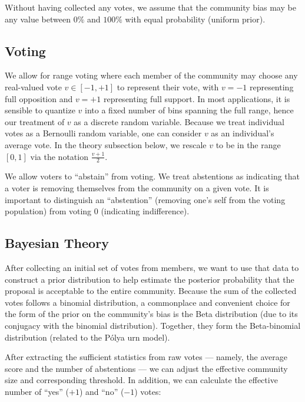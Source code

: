 \documentclass[chi_draft]{sigchi}
\begin{document}
Without having collected any votes, we assume that the community bias may be any value between $0\%$ and $100\%$ with equal probability (uniform prior).

\subsection{Voting}
We allow for range voting where each member of the community may choose any real-valued vote $v \in [-1,+1]$ to
represent their vote, with $v = -1$ representing full opposition and $v=+1$ representing full support.  In most applications, it is sensible to quantize $v$ into a fixed number of bins spanning the full range, hence our treatment of $v$ as a discrete random variable.  Because we treat individual votes as a Bernoulli random variable, one can consider $v$ as an individual's average vote.  In the theory subsection below, we rescale $v$ to be in the range $[0,1]$ via the notation $\frac{v + 1}{2}$.

We allow voters to ``abstain'' from voting.
We treat abstentions as indicating that a voter is removing themselves from the community on a given vote.
It is important to distinguish an ``abstention'' (removing one's self from the voting population) from voting $0$ (indicating indifference).

\subsection{Bayesian Theory}


After collecting an initial set of votes from members, we want to use that data to construct a prior distribution to help estimate the posterior probability that the proposal is acceptable to the entire community.  Because the sum of  the collected votes follows a binomial distribution, a commonplace and convenient choice for the form of the prior on the community's bias is the Beta distribution (due to its conjugacy with the binomial distribution).  Together, they form the Beta-binomial distribution (related to the P\'olya urn model).

After extracting the sufficient statistics from raw votes --- namely, the average score and the number of abstentions --- we can adjust the effective community size and corresponding threshold.  In addition, we can calculate the effective number of ``yes'' ($+1$) and ``no'' ($-1$) votes:
\end{document}
